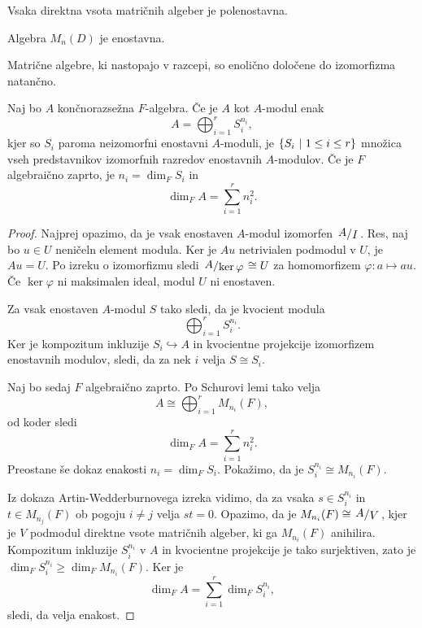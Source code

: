 \begin{opomba}
Vsaka direktna vsota matričnih algeber je polenostavna.
\end{opomba}

\begin{opomba}
Algebra $M_n(D)$ je enostavna.
\end{opomba}

\begin{opomba}
Matrične algebre, ki nastopajo v razcepi, so enolično določene do
izomorfizma natančno.
\end{opomba}

\begin{posledica}
Naj bo $A$ končnorazsežna $F$-algebra. Če je $A$ kot $A$-modul enak
\[
A = \bigoplus_{i=1}^r S_i^{n_i},
\]
kjer so $S_i$ paroma neizomorfni enostavni $A$-moduli, je
$\left\{S_i~\middle\vert~1 \leq i \leq r\right\}$ množica vseh predstavnikov izomorfnih
razredov enostavnih $A$-modulov. Če je $F$ algebraično zaprto, je
$n_i = \dim_F S_i$ in
\[
\dim_F A = \sum_{i=1}^r n_i^2.
\]
\end{posledica}

\begin{proof}
Najprej opazimo, da je vsak enostaven $A$-modul izomorfen
$\kvoc{A}{I}$. Res, naj bo $u \in U$ neničeln element modula.
Ker je $Au$ netrivialen podmodul v $U$, je $Au = U$. Po izreku o
izomorfizmu sledi $\kvoc{A}{\ker \varphi} \cong U$ za homomorfizem
$\varphi \colon a \mapsto au$. Če $\ker \varphi$ ni maksimalen
ideal, modul $U$ ni enostaven.

Za vsak enostaven $A$-modul $S$ tako sledi, da je kvocient modula
\[
\bigoplus_{i=1}^r S_i^{n_i}.
\]
Ker je kompozitum inkluzije $S_i \hookrightarrow A$ in kvocientne
projekcije izomorfizem enostavnih modulov, sledi, da za nek $i$
velja $S \cong S_i$.

Naj bo sedaj $F$ algebraično zaprto. Po Schurovi lemi tako velja
\[
A \cong \bigoplus_{i=1}^r M_{n_i}(F),
\]
od koder sledi
\[
\dim_F A = \sum_{i=1}^r n_i^2.
\]
Preostane še dokaz enakosti $n_i = \dim_F S_i$. Pokažimo, da je
$S_i^{n_i} \cong M_{n_i}(F)$.

Iz dokaza Artin-Wedderburnovega izreka vidimo, da za vsaka
$s \in S_i^{n_i}$ in $t \in M_{n_j}(F)$ ob pogoju $i \ne j$ velja
$st = 0$. Opazimo, da je $M_{n_i}(F) \cong \kvoc{A}{V}$, kjer je
$V$ podmodul direktne vsote matričnih algeber, ki ga $M_{n_i}(F)$
anihilira. Kompozitum inkluzije $S_i^{n_i}$ v $A$ in kvocientne
projekcije je tako surjektiven, zato je
$\dim_F S_i^{n_i} \geq \dim_F M_{n_i}(F)$. Ker je
\[
\dim_F A = \sum_{i=1}^r \dim_F S_i^{n_i},
\]
sledi, da velja enakost.
\end{proof}


